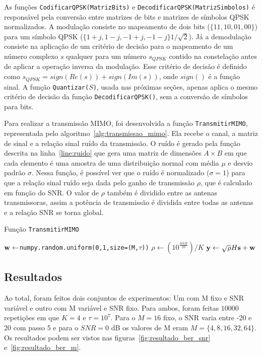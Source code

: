 \documentclass{article}
\begin{document}
As funções \texttt{CodificarQPSK(MatrizBits)} e \texttt{DecodificarQPSK(MatrizSimbolos)} é responsável pela conversão entre matrizes de bits e matrizes de símbolos QPSK normalizados. A modulação consiste no mapeamento de dois bits ($\{11,10,01,00\}$) para um símbolo QPSK ($\{1+j,1-j,-1+j,-1-j\}1/\sqrt{2}$). Já a demodulação consiste na aplicação de um critério de decisão para o mapeamento de um número complexo $s$ qualquer para um número $s_{QPSK}$ contido na constelação antes de aplicar a operação inversa da modulação. Esse critério de decisão é definido como $s_{QPSK}=sign(Re(s))+sign(Im(s))$, onde $sign()$ é a função sinal. A função \texttt{Quantizar($S$)}, usada nas próximas seções, apenas aplica o mesmo critério de decisão da função \texttt{DecodificarQPSK()}, sem a conversão de símbolos para bits. 

Para realizar a transmissão MIMO, foi desenvolvida a função \texttt{TransmitirMIMO}, representada pelo algoritmo~\ref{alg:transmissao_mimo}. Ela recebe o canal, a matriz de sinal e a relação sinal ruído da transmissão. O ruído é gerado pela função descrita na linha~\ref{line:ruido} que gera uma matriz de dimensões $A\times B$ em que cada elemento é uma amostra de uma distribuição normal com média $\mu$ e desvio padrão $\sigma$. Nessa função, é possível ver que o ruído é normalizado ($\sigma=1$) para que a relação sinal ruído seja dada pelo ganho de transmissão $\rho$, que é calculado em função do SNR. O valor de $\rho$ também é dividido entre as antenas transmissoras, assim a potência de transmissão é dividida entre todas as antenas e a relação SNR se torna global. 

\begin{algorithm}
    \label{alg:transmissao_mimo}
    \caption{Função \texttt{TransmitirMIMO}}
    \KwResult{$\ybf$}
    $\mathbf{w} \gets $\texttt{numpy.random.uniform(0,1,size=(M,$\tau$))}\; \label{line:ruido}
    $\rho \gets (10^{\frac{SNR}{10}})/K$\;
    $\mathbf{y} \gets \sqrt{\rho}H\mathbf{s}+\mathbf{w}$\;
\end{algorithm}

\subsection{Resultados}


Ao total, foram feitos dois conjuntos de experimentos: Um com M fixo e SNR variável e outro com M variável e SNR fixo. Para ambos, foram feitas $10000$ repetições em que $K=4$ e $\tau=10^7$. Para o $M=16$ fixo, o SNR varia entre -20 e 20 com passo 5 e para o $SNR = 0$ dB os valores de M eram $M=\{4,8,16,32,64\}$. Os resultados podem ser vistos nas figuras~\ref{fig:resultado_ber_snr} e~\ref{fig:resultado_ber_m}. 
\end{document}
